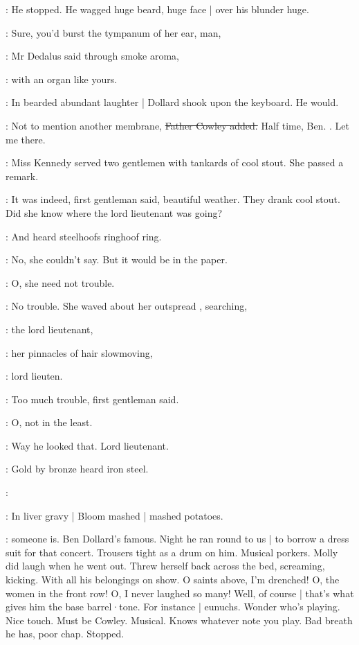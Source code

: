 :
He stopped.
He wagged huge beard,
huge face |
over his blunder huge.

\simon:
Sure,
you'd burst the tympanum of her ear,
man,

:
Mr Dedalus said through smoke aroma,

\simon:
with an organ like yours.

:
In bearded abundant laughter |
Dollard shook upon the keyboard.
He would.

\cowley:
Not to mention another membrane,
\sout{Father Cowley added.}
Half time, Ben.
.
Let me there.

:
Miss Kennedy served two gentlemen with tankards of cool stout.
She passed a remark.

:
It was indeed,
first gentleman said,
beautiful weather.
They drank cool stout.
Did she know where the lord lieutenant was going?

:
And heard steelhoofs ringhoof ring.

:
No,
she couldn't say.
But it would be in the paper.

:
O, she need not trouble.

:
No trouble.
She waved about her outspread ,
searching,

\MissKInt:
the lord lieutenant,

:
her pinnacles of hair slowmoving,

\MissKInt:
lord lieuten.

:
Too much trouble,
first gentleman said.

:
O, not in the least.

\MissKInt:
Way he looked that.
Lord lieutenant.

:
Gold by bronze
heard iron steel.%

\dollard:

:
In liver gravy |
Bloom mashed |
mashed potatoes.

\BloomIntB:
 someone is.
Ben Dollard's famous.
Night he ran round to us |
to borrow a dress suit for that concert.
Trousers tight as a drum on him.
Musical porkers.
Molly did laugh when he went out.
Threw herself back across the bed,
screaming,
kicking.
With all his belongings on show.
O saints above,
I'm drenched!
O, the women in the front row!
O, I never laughed so many!
Well,
of course |
that's what gives him the base barrel·tone.
For instance |
eunuchs.
Wonder who's playing.
Nice touch.
Must be Cowley.
Musical.
Knows whatever note you play.
Bad breath he has,
poor chap.
Stopped.

